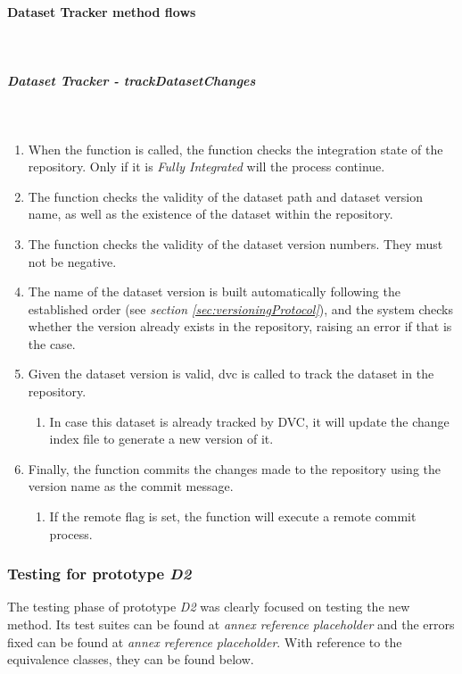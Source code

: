 \paragraph{Dataset Tracker method flows} \mbox{}\\

\subparagraph{Dataset Tracker - trackDatasetChanges} \mbox{}\\

\begin{enumerate}
    \item When the function is called, the function checks the integration state of the repository. Only if it is \emph{Fully Integrated} will the process continue.
    \item The function checks the validity of the dataset path and dataset version name, as well as the existence of the dataset within the repository.
    \item The function checks the validity of the dataset version numbers. They must not be negative.
    \item The name of the dataset version is built automatically following the established order (see \emph{section \ref{sec:versioningProtocol}}), and the system checks whether the version already exists in the repository, raising an error if that is the case.
    \item Given the dataset version is valid, dvc is called to track the dataset in the repository.
    \begin{enumerate}
        \item In case this dataset is already tracked by DVC, it will update the change index file to generate a new version of it.
    \end{enumerate}

    \item Finally, the function commits the changes made to the repository using the version name as the commit message.
    \begin{enumerate}
        \item If the remote flag is set, the function will execute a remote commit process.
    \end{enumerate}
\end{enumerate}

\subsubsection{Testing for prototype \emph{D2}}

The testing phase of prototype \emph{D2} was clearly focused on testing the new method. Its test suites can be found at \emph{annex reference placeholder} and the errors fixed can be found at \emph{annex reference placeholder}.
With reference to the equivalence classes, they can be found below.

